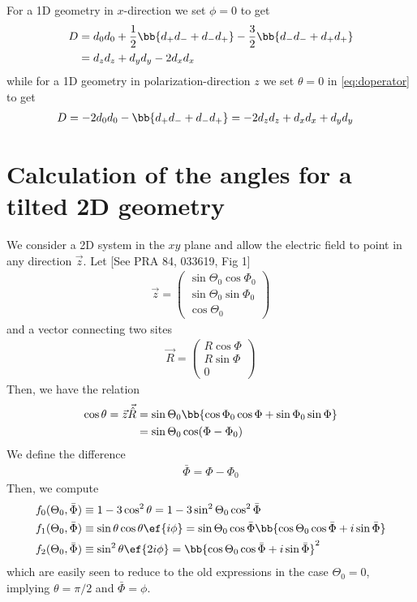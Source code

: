 For a 1D geometry in $x$-direction we set $\phi=0$ to get
\begin{align*}
D &= d_0 d_0 + \frac{1}{2}\bb{d_+ d_- + d_- d_+} -\frac{3}{2} \bb{d_- d_- + d_+ d_+}\\
 &= d_z d_z + d_y d_y - 2 d_x d_x
\end{align*}
while for a 1D geometry in polarization-direction $z$ we set $\theta=0$ in \eqref{eq:doperator} to get
\begin{align*}
D &= -2 d_0 d_0 - \bb{d_+ d_- + d_- d_+} = -2 d_z d_z+ d_x d_x + d_y d_y
\end{align*}

\section{Calculation of the angles for a tilted 2D geometry}
We consider a 2D system in the $xy$ plane and allow the electric field to point in any direction $\vec{z}$. Let [See PRA 84, 033619, Fig 1]
\begin{align}
\vec{z}=\begin{pmatrix}\sin\Theta_0\cos\Phi_0 \\ \sin\Theta_0\sin\Phi_0 \\ \cos\Theta_0\end{pmatrix}
\end{align}
and a vector connecting two sites
\begin{align}
\vec{R}=\begin{pmatrix}R\cos\Phi \\ R\sin\Phi \\ 0\end{pmatrix}
\end{align}
Then, we have the relation
\begin{align}
\cos\theta = \vec{z}\vec{\hat{R}} &= \sin\Theta_0\bb{\cos\Phi_0\cos\Phi+\sin\Phi_0\sin\Phi}\\
&=\sin\Theta_0\cos(\Phi-\Phi_0)
\end{align}
We define the difference
\begin{align}
\bar\Phi=\Phi-\Phi_0
\end{align}
Then, we compute
\begin{align}
    f_0(\Theta_0, \bar \Phi)&\equiv 1-3\cos^2\theta = 1-3\sin^2\Theta_0\cos^2\bar\Phi  \\
    f_1(\Theta_0, \bar \Phi)&\equiv \sin\theta\cos\theta \ef{i\phi} = \sin\Theta_0 \cos\bar\Phi \bb{\cos\Theta_0 \cos\bar\Phi + i \sin \bar\Phi}\\
    f_2(\Theta_0, \bar \Phi)&\equiv\sin^2\theta \ef{2i\phi} = \bb{\cos\Theta_0 \cos\bar\Phi + i \sin \bar\Phi}^2
\end{align}
which are easily seen to reduce to the old expressions in the case $\Theta_0=0$,
implying $\theta=\pi/2$ and $\bar\Phi=\phi$.

